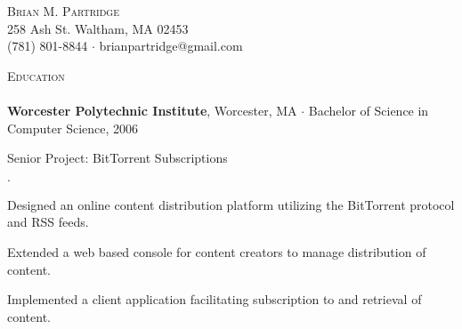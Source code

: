 \documentclass[11pt]{article}
\newcommand{\mydot}{$\cdot$ }
\newcommand{\lineunder}{\vspace*{-8pt} \\ \hspace*{-18pt} \hrulefill \\}
\newcommand{\header}[1]{{\hspace*{-15pt}\vspace*{6pt} \textsc{#1}} \vspace*{-6pt} \lineunder}
\newcommand{\contact}[3]{\vspace*{-8pt}\begin{center}{\LARGE \scshape {#1}}\\#2 \\ #3\end{center}\vspace*{-8pt}}
\newcommand{\school}[3]{\textbf{#1}{#2} \mydot #3 \\}
\newenvironment{courses}{\begin{list}{\mydot}{\topsep 0pt \itemsep -2pt}}{\vspace*{4pt}\end{list}}
\newcommand{\seniorproject}[2]{Senior Project: #1\\ #2  }
\newenvironment{achievements}{\begin{list}{\mydot}{\topsep 0pt \itemsep -2pt}}{\vspace*{4pt}\end{list}}
\begin{document}
\small
\smallskip
\vspace*{-44pt}


\contact{Brian M. Partridge}
{258 Ash St. Waltham, MA 02453}
{
(781) 801-8844
\mydot brianpartridge@gmail.com 
}


\header{Education}
\school{Worcester Polytechnic Institute}{, Worcester, MA}{Bachelor of Science in Computer Science, 2006}

\begin{comment}
Selected Coursework:
\vspace*{-10pt}
\begin{multicols}{3}
\begin{courses}
  \item Operating Systems
  \item Distributed Computer Systems
  \item Software Engineering
  \item Computer Networks
  \item Human-Computer Interaction
  \item Databases
  \item Algorithms
  \item Webware
\end{courses}
\end{multicols}
\vspace*{-12pt}
\end{comment}

\seniorproject{BitTorrent Subscriptions}{
\begin{achievements}
  \item Designed an online content distribution platform utilizing the BitTorrent protocol and RSS feeds.
  \item Extended a web based console for content creators to manage distribution of content.
  \item Implemented a client application facilitating subscription to and retrieval of content.
\end{achievements}
}

\end{document}
